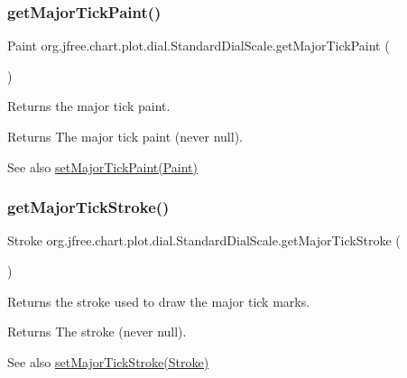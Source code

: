 \subsubsection{\texorpdfstring{get\+Major\+Tick\+Paint()}{getMajorTickPaint()}}
{\footnotesize\ttfamily Paint org.\+jfree.\+chart.\+plot.\+dial.\+Standard\+Dial\+Scale.\+get\+Major\+Tick\+Paint (\begin{DoxyParamCaption}{ }\end{DoxyParamCaption})}

Returns the major tick paint.

\begin{DoxyReturn}{Returns}
The major tick paint (never {\ttfamily null}).
\end{DoxyReturn}
\begin{DoxySeeAlso}{See also}
\mbox{\hyperlink{classorg_1_1jfree_1_1chart_1_1plot_1_1dial_1_1_standard_dial_scale_a5a0156ff2213c5ad5cf20ffc4bee3f20}{set\+Major\+Tick\+Paint(\+Paint)}} 
\end{DoxySeeAlso}
\mbox{\label{classorg_1_1jfree_1_1chart_1_1plot_1_1dial_1_1_standard_dial_scale_a0c2929b27154af3a0e35a389cf4c72e4}} 
\subsubsection{\texorpdfstring{get\+Major\+Tick\+Stroke()}{getMajorTickStroke()}}
{\footnotesize\ttfamily Stroke org.\+jfree.\+chart.\+plot.\+dial.\+Standard\+Dial\+Scale.\+get\+Major\+Tick\+Stroke (\begin{DoxyParamCaption}{ }\end{DoxyParamCaption})}

Returns the stroke used to draw the major tick marks.

\begin{DoxyReturn}{Returns}
The stroke (never {\ttfamily null}).
\end{DoxyReturn}
\begin{DoxySeeAlso}{See also}
\mbox{\hyperlink{classorg_1_1jfree_1_1chart_1_1plot_1_1dial_1_1_standard_dial_scale_a4c6d4803607415d70ea1219befec466a}{set\+Major\+Tick\+Stroke(\+Stroke)}} 
\end{DoxySeeAlso}
\mbox{\label{classorg_1_1jfree_1_1chart_1_1plot_1_1dial_1_1_standard_dial_scale_afc449f87dcd315c12ecf88720ebd0097}} 
